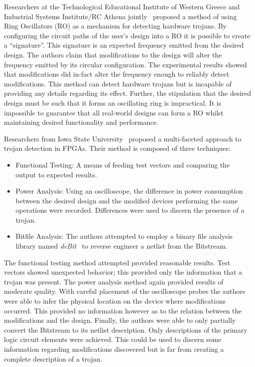 \documentclass[journal, hidelinks]{IEEEtran}
\begin{document}
Researchers at the Technological Educational Institute of Western Greece and Industrial Systems Institute/RC Athena jointly~\cite{ringOscillatorMethod} proposed a method of using Ring Oscillators (RO) as a mechanism for detecting hardware trojans.
By configuring the circuit paths of the user's design into a RO it is possible to create a ``signature''.
This signature is an expected frequency emitted from the desired design. 
The authors claim that modifications to the design will alter the frequency emitted by its circular configuration.
The experimental results showed that modifications did in-fact alter the frequency enough to reliably detect modifications.
This method can detect hardware trojans but is incapable of providing any details regarding its effect.
Further, the stipulation that the desired design must be such that it forms an oscillating ring is impractical.
It is impossible to guarantee that all real-world designs can form a RO whilst maintaining desired functionality and performance.

Researchers from Iowa State University~\cite{multiFacetedApproach} proposed a multi-faceted approach to trojan detection in FPGAs.
Their method is composed of three techniques:
\begin{itemize}
	\item Functional Testing: A means of feeding test vectors and comparing the output to expected results.
	\item Power Analysis: Using an oscilloscope, the difference in power consumption between the desired design and the modified devices performing the same operations were recorded. Differences were used to discern the presence of a trojan.
	\item Bitfile Analysis: The authors attempted to employ a binary file analysis library named \textit{deBit}~\cite{bitStreamToNetlist} to reverse engineer a netlist from the Bitstream.
\end{itemize}
The functional testing method attempted provided reasonable results. 
Test vectors showed unexpected behavior; this provided only the information that a trojan was present.
The power analysis method again provided results of moderate quality.
With careful placement of the oscilloscope probes the authors were able to infer the physical location on the device where modifications occurred.
This provided no information however as to the relation between the modifications and the design.
Finally, the authors were able to only partially convert the Bitstream to its netlist description.
Only descriptions of the primary logic circuit elements were achieved.
This could be used to discern some information regarding modifications discovered but is far from creating a complete description of a trojan.
\end{document}
